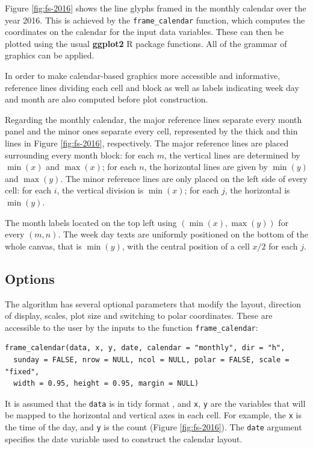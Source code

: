 \documentclass[12pt]{article}
\begin{document}
Figure \ref{fig:fs-2016} shows the line glyphs framed in the monthly
calendar over the year 2016. This is achieved by the
\texttt{frame\_calendar} function, which computes the coordinates on the
calendar for the input data variables. These can then be plotted using
the usual \textbf{ggplot2} R package \citep{R-ggplot2} functions. All of
the grammar of graphics can be applied.

In order to make calendar-based graphics more accessible and
informative, reference lines dividing each cell and block as well as
labels indicating week day and month are also computed before plot
construction.

Regarding the monthly calendar, the major reference lines separate every
month panel and the minor ones separate every cell, represented by the
thick and thin lines in Figure \ref{fig:fs-2016}, respectively. The
major reference lines are placed surrounding every month block: for each
\(m\), the vertical lines are determined by \(\min{(x)}\) and
\(\max{(x)}\); for each \(n\), the horizontal lines are given by
\(\min{(y)}\) and \(\max{(y)}\). The minor reference lines are only
placed on the left side of every cell: for each \(i\), the vertical
division is \(\min{(x)}\); for each \(j\), the horizontal is
\(\min{(y)}\).

The month labels located on the top left using
\((\min{(x)}, \max{(y)})\) for every \((m, n)\). The week day texts are
uniformly positioned on the bottom of the whole canvas, that is
\(\min{(y)}\), with the central position of a cell \(x / 2\) for each
\(j\).

\hypertarget{options}{%
\subsection{Options}\label{options}}

\label{sec:opt}

The algorithm has several optional parameters that modify the layout,
direction of display, scales, plot size and switching to polar
coordinates. These are accessible to the user by the inputs to the
function \texttt{frame\_calendar}:

\begin{verbatim}
frame_calendar(data, x, y, date, calendar = "monthly", dir = "h", 
  sunday = FALSE, nrow = NULL, ncol = NULL, polar = FALSE, scale = "fixed", 
  width = 0.95, height = 0.95, margin = NULL)
\end{verbatim}

It is assumed that the \texttt{data} is in tidy format
\citep{wickham2014tidy}, and \texttt{x}, \texttt{y} are the variables
that will be mapped to the horizontal and vertical axes in each cell.
For example, the \texttt{x} is the time of the day, and \texttt{y} is
the count (Figure \ref{fig:fs-2016}). The \texttt{date} argument
specifies the date variable used to construct the calendar layout.
\end{document}
